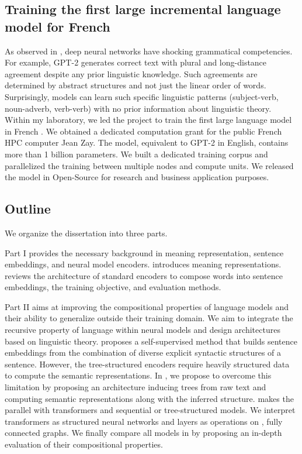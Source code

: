 \subsection{Training the first large incremental language model for French}

As observed in \textcite{linzen_2020}, deep neural networks have shocking grammatical competencies. For example, GPT-2 generates correct text with plural and long-distance agreement despite any prior linguistic knowledge. Such agreements are determined by abstract structures and not just the linear order of words. Surprisingly, models can learn such specific linguistic patterns (subject-verb, noun-adverb, verb-verb) with no prior information about linguistic theory. Within my laboratory, we led the project to train the first large language model in French \parencite{simoulin_2021c}. We obtained a dedicated computation grant for the public French HPC computer Jean Zay. The model, equivalent to GPT-2 in English, contains more than 1 billion parameters. We built a dedicated training corpus and parallelized the training between multiple nodes and compute units. We released the model in Open-Source for research and business application purposes. 

\subsection{Outline}

We organize the dissertation into three parts. 

Part I provides the necessary background in meaning representation, sentence embeddings, and neural model encoders.  introduces meaning representations.  reviews the architecture of standard encoders to compose words into sentence embeddings, the training objective, and evaluation methods.

Part II aims at improving the compositional properties of language models and their ability to generalize outside their training domain. We aim to integrate the recursive property of language within neural models and design architectures based on linguistic theory.  proposes a self-supervised method that builds sentence embeddings from the combination of diverse explicit syntactic structures of a sentence. However, the tree-structured encoders require heavily structured data to compute the semantic representations. In , we propose to overcome this limitation by proposing an architecture inducing trees from raw text and computing semantic representations along with the inferred structure.  makes the parallel with transformers and sequential or tree-structured models. We interpret transformers as structured neural networks and layers as operations on , fully connected graphs. We finally compare all models in  by proposing an in-depth evaluation of their compositional properties.

